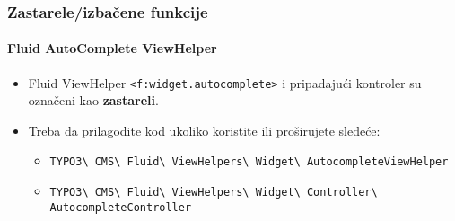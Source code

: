 \begin{frame}[fragile]
	\frametitle{Zastarele/izbačene funkcije}
	\framesubtitle{Fluid AutoComplete ViewHelper}

	\begin{itemize}
		\item Fluid ViewHelper \texttt{<f:widget.autocomplete>} i pripadajući
			kontroler su označeni kao \textbf{zastareli}.
		\item Treba da prilagodite kod ukoliko koristite ili proširujete sledeće:

			\begin{itemize}\smaller
				\item \texttt{TYPO3\textbackslash
					CMS\textbackslash
					Fluid\textbackslash
					ViewHelpers\textbackslash
					Widget\textbackslash
					AutocompleteViewHelper}
				\item \texttt{TYPO3\textbackslash
					CMS\textbackslash
					Fluid\textbackslash
					ViewHelpers\textbackslash
					Widget\textbackslash
					Controller\textbackslash
					AutocompleteController}
			\end{itemize}

	\end{itemize}

\end{frame}


